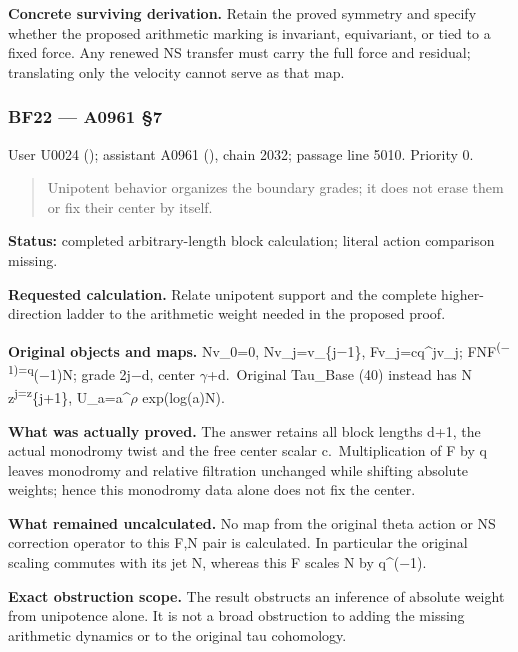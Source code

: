 \documentclass[10pt,a4paper,oneside]{report}
\begin{document}
\textbf{Concrete surviving derivation.} Retain the proved symmetry and
specify whether the proposed arithmetic marking is invariant,
equivariant, or tied to a fixed force. Any renewed NS transfer must
carry the full force and residual; translating only the velocity cannot
serve as that map.

\subsubsection{BF22 --- A0961 §7}\label{bf22-a0961-7}

User U0024 (\protect{});
assistant A0961 (\protect{}),
chain 2032; passage line 5010. Priority 0.

\begin{quote}
Unipotent behavior organizes the boundary grades; it does not erase them
or fix their center by itself.
\end{quote}

\textbf{Status:} completed arbitrary-length block calculation; literal
action comparison missing.

\textbf{Requested calculation.} Relate unipotent support and the
complete higher-direction ladder to the arithmetic weight needed in the
proposed proof.

\textbf{Original objects and maps.} Nv\_0=0,
Nv\_j=v\_\{j\allowbreak{}\ensuremath{−}\allowbreak{}1\},
Fv\_j=cq\^{}jv\_j;
FNF\textsuperscript{(\allowbreak{}\ensuremath{−}\allowbreak{}1)=q}(\allowbreak{}\ensuremath{−}\allowbreak{}1)N;
grade 2j\allowbreak{}\ensuremath{−}\allowbreak{}d, center
\allowbreak{}\ensuremath{γ}\allowbreak{}+d. Original Tau\_Base (40)
instead has N z\textsuperscript{j=z}\{j+1\},
U\_a=a\textasciicircum{}\allowbreak{}\ensuremath{ρ}\allowbreak{}
exp(log(a)N).

\textbf{What was actually proved.} The answer retains all block lengths
d+1, the actual monodromy twist and the free center scalar
c.~Multiplication of F by q leaves monodromy and relative filtration
unchanged while shifting absolute weights; hence this monodromy data
alone does not fix the center.

\textbf{What remained uncalculated.} No map from the original theta
action or NS correction operator to this F,N pair is calculated. In
particular the original scaling commutes with its jet N, whereas this F
scales N by
q\textasciicircum{}(\allowbreak{}\ensuremath{−}\allowbreak{}1).

\textbf{Exact obstruction scope.} The result obstructs an inference of
absolute weight from unipotence alone. It is not a broad obstruction to
adding the missing arithmetic dynamics or to the original tau
cohomology.
\end{document}
